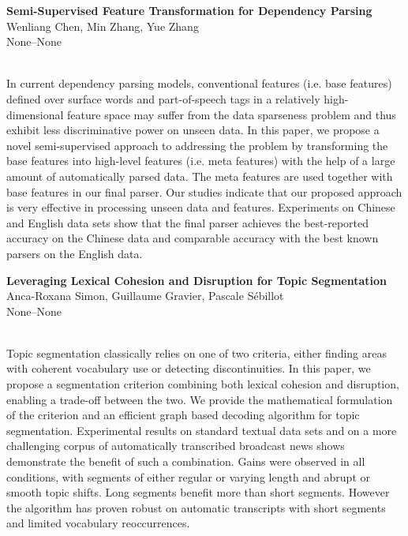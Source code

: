 \documentclass[twoside,makeidx]{book}
\begin{document}
\par\vspace{2em}\noindent%
\begin{minipage}{\linewidth}%
\begin{center}
\textbf{\normalsize Semi-Supervised Feature Transformation for Dependency Parsing}\\
\normalsize  Wenliang Chen,  Min Zhang,  Yue Zhang\\
{\small None--None}\\
\end{center}
\end{minipage}\\[0.5em]
\nopagebreak%
\noindent%
{\small In current dependency parsing models, conventional features (i.e. base features) defined over surface words and part-of-speech tags in a relatively high-dimensional feature space may suffer from the data sparseness problem and thus exhibit less discriminative power on unseen data. In this paper, we propose a novel semi-supervised approach to addressing the problem by transforming the base features into high-level features (i.e. meta features) with the help of a large amount of automatically parsed data. The meta features are used together with base features in our final parser. Our studies indicate that our proposed approach is very effective in processing unseen data and features. Experiments on Chinese and English data sets show that the final parser achieves the best-reported accuracy on the Chinese data and comparable accuracy with the best known parsers on the English data.}
\par\vspace{2em}\noindent%
\begin{minipage}{\linewidth}%
\begin{center}
\textbf{\normalsize Leveraging Lexical Cohesion and Disruption for Topic Segmentation}\\
\normalsize  Anca-Roxana Simon,  Guillaume Gravier,  Pascale S\'{e}billot\\
{\small None--None}\\
\end{center}
\end{minipage}\\[0.5em]
\nopagebreak%
\noindent%
{\small Topic segmentation classically relies on one of two criteria, either finding areas with coherent vocabulary use or detecting discontinuities. In this paper, we propose a segmentation criterion combining both lexical cohesion and disruption, enabling a trade-off between the two. We provide the mathematical formulation of the criterion and an efficient graph based decoding algorithm for topic segmentation. Experimental results on standard textual data sets and on a more challenging corpus of automatically transcribed broadcast news shows demonstrate the benefit of such a combination. Gains were observed in all conditions, with segments of either regular or varying length and abrupt or smooth topic shifts. Long segments benefit more than short segments. However the algorithm has proven robust on automatic transcripts with short segments and limited vocabulary reoccurrences.}
\end{document}
